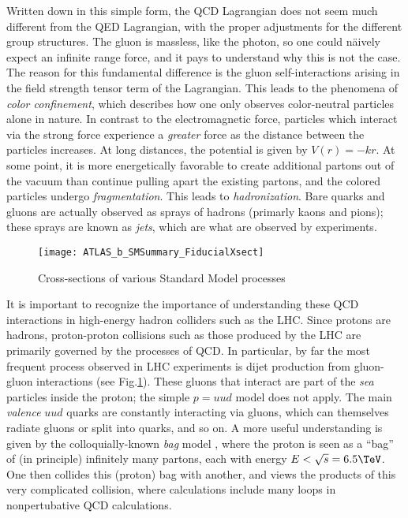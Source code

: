 Written down in this simple form, the QCD Lagrangian does not seem much different from the QED Lagrangian, with the proper adjustments for the different group structures.
The gluon is massless, like the photon, so one could n\"aively expect an infinite range force, and it pays to understand why this is not the case.
The reason for this fundamental difference is the gluon self-interactions  arising in the field strength tensor term of the Lagrangian.
This leads to the phenomena of \textit{color confinement}, which describes how one only observes color-neutral particles alone in nature.
In contrast to the electromagnetic force, particles which interact via the strong force experience a \textit{greater} force as the distance between the particles increases.
At long distances, the potential is given by $V(r) = -kr$.
At some point, it is more energetically favorable to create additional partons out of the vacuum than continue pulling apart the existing partons, and the colored particles undergo \textit{fragmentation}.
This leads to \textit{hadronization}.
Bare quarks and gluons are actually observed as sprays of hadrons (primarly kaons and pions); these sprays are known as \textit{jets}, which are what are observed by experiments.

\begin{figure}
\caption{Cross-sections of various Standard Model processes}
\label{fig:sm_xsec}
\texttt{[image: ATLAS\_b\_SMSummary\_FiducialXsect]}
\end{figure}

It is important to recognize the importance of understanding these QCD interactions in high-energy hadron colliders such as the LHC.
Since protons are hadrons, proton-proton collisions such as those produced by the LHC are primarily governed by the processes of QCD.
In particular, by far the most frequent process observed in LHC experiments is dijet production from gluon-gluon interactions (see Fig.\ref{fig:sm_xsec}).
These gluons that interact are part of the \textit{sea} particles inside the proton; the simple $p = uud$ model does not apply.
The main \textit{valence} $uud$ quarks are constantly interacting via gluons, which can themselves radiate gluons or split into quarks, and so on.
A more useful understanding is given by the colloquially-known \textit{bag} model \cite{Chodos:1974je, Chodos:1974pn}, where the proton is seen as a ``bag'' of (in principle) infinitely many partons, each with energy $ E < \sqrt{s} = 6.5 \TeV$.
One then collides this (proton) bag with another, and views the products of this very complicated collision, where calculations include many loops in nonpertubative QCD calculations.

